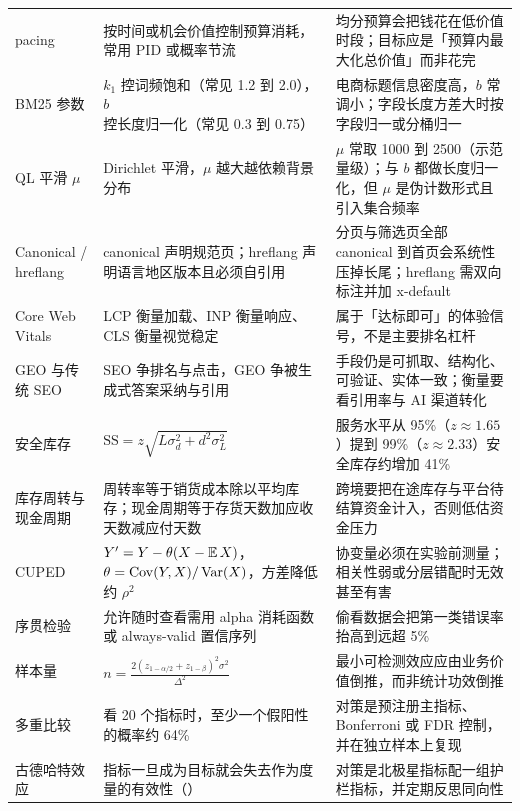 \begin{xltabular}{\textwidth}{L{2.5cm} L{4.4cm} L{7.2cm}}
pacing & 按时间或机会价值控制预算消耗，常用 PID 或概率节流 & 均分预算会把钱花在低价值时段；目标应是「预算内最大化总价值」而非花完 \\

BM25 参数 & $k_1$ 控词频饱和（常见 1.2 到 2.0），$b$ 控长度归一化（常见 0.3 到 0.75） & 电商标题信息密度高，$b$ 常调小；字段长度方差大时按字段归一或分桶归一 \\

QL 平滑 $\mu$ & Dirichlet 平滑，$\mu$ 越大越依赖背景分布 & $\mu$ 常取 1000 到 2500（示范量级）；与 $b$ 都做长度归一化，但 $\mu$ 是伪计数形式且引入集合频率 \\

Canonical / hreflang & canonical 声明规范页；hreflang 声明语言地区版本且必须自引用 & 分页与筛选页全部 canonical 到首页会系统性压掉长尾；hreflang 需双向标注并加 x-default \\

Core Web Vitals & LCP 衡量加载、INP 衡量响应、CLS 衡量视觉稳定 & 属于「达标即可」的体验信号，不是主要排名杠杆 \\

GEO 与传统 SEO & SEO 争排名与点击，GEO 争被生成式答案采纳与引用 & 手段仍是可抓取、结构化、可验证、实体一致；衡量要看引用率与 AI 渠道转化 \\

安全库存 & $\text{SS}=z\sqrt{L\sigma_d^2+d^2\sigma_L^2}$ & 服务水平从 95\%（$z\approx 1.65$）提到 99\%（$z\approx 2.33$）安全库存约增加 41\% \\

库存周转与现金周期 & 周转率等于销货成本除以平均库存；现金周期等于存货天数加应收天数减应付天数 & 跨境要把在途库存与平台待结算资金计入，否则低估资金压力 \\

CUPED & $Y'=Y-\theta(X-\operatorname{\mathbb{E}} X)$，$\theta=\operatorname{Cov}(Y,X)/\operatorname{Var}(X)$，方差降低约 $\rho^2$ & 协变量必须在实验前测量；相关性弱或分层错配时无效甚至有害 \\

序贯检验 & 允许随时查看需用 alpha 消耗函数或 always-valid 置信序列 & 偷看数据会把第一类错误率抬高到远超 5\% \\

样本量 & $n=\frac{2(z_{1-\alpha/2}+z_{1-\beta})^2\sigma^2}{\Delta^2}$ & 最小可检测效应应由业务价值倒推，而非统计功效倒推 \\

多重比较 & 看 20 个指标时，至少一个假阳性的概率约 64\% & 对策是预注册主指标、Bonferroni 或 FDR 控制，并在独立样本上复现 \\

古德哈特效应 & 指标一旦成为目标就会失去作为度量的有效性（\cite{goodhart1975}） & 对策是北极星指标配一组护栏指标，并定期反思同向性 \\

\end{xltabular}

